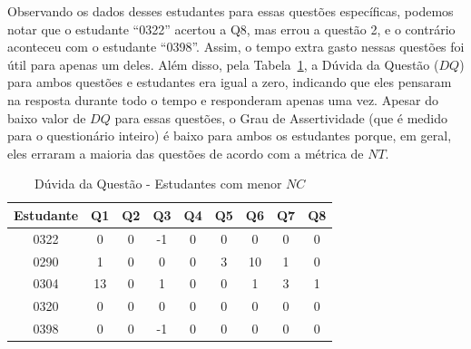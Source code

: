 Observando os dados desses estudantes para essas questões específicas, podemos notar que o estudante ``0322'' acertou a Q8, mas errou a questão 2, e o contrário aconteceu com o estudante ``0398''. Assim, o tempo extra gasto nessas questões foi útil para apenas um deles. Além disso, pela Tabela~\ref{tab:QD_3rdquadrant}, a Dúvida da Questão ($DQ$) para ambos questões e estudantes era igual a zero, indicando que eles pensaram na resposta durante todo o tempo e responderam apenas uma vez. Apesar do baixo valor de $DQ$ para essas questões, o Grau de Assertividade (que é medido para o questionário inteiro) é baixo para ambos os estudantes porque, em geral, eles erraram a maioria das questões de acordo com a métrica de $NT$.

\begin{table}[htbp]
\caption{Dúvida da Questão - Estudantes com menor $NC$}
\centering
\begin{tabular}{|c|c|c|c|c|c|c|c|c|}
\hline
\textbf{Estudante} & \textbf{Q1} & \textbf{Q2} & \textbf{Q3} & \textbf{Q4} & \textbf{Q5} & \textbf{Q6} & \textbf{Q7} & \textbf{Q8} \\ \hline
0322 & 0 & 0 & -1 & 0 & 0 & 0 & 0 & 0 \\ \hline
0290 & 1 & 0 & 0 & 0 & 3 & 10 & 1 & 0 \\ \hline
0304 & 13 & 0 & 1 & 0 & 0 & 1 & 3 & 1 \\ \hline
0320 & 0 & 0 & 0 & 0 & 0 & 0 & 0 & 0 \\ \hline
0398 & 0 & 0 & -1 & 0 & 0 & 0 & 0 & 0 \\ \hline
\end{tabular}
\label{tab:QD_3rdquadrant}
\end{table}


